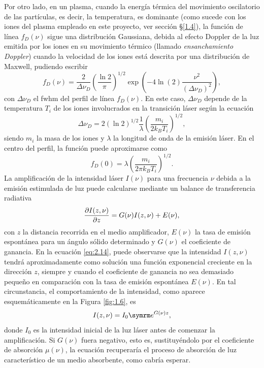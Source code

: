 Por otro lado, en un plasma, cuando la energía térmica del movimiento oscilatorio de las partículas, es decir, la temperatura, es dominante (como sucede con los iones del plasma empleado en este proyecto, ver sección \S\ref{1.4}), la función de línea $f_{D}(\nu)$ sigue una distribución Gaussiana, debida al efecto Doppler de la luz emitida por los iones en su movimiento térmico (llamado \emph{ensanchamiento Doppler})  cuando la velocidad de los iones está descrita por una distribución de Maxwell, pudiendo escribir \autocite{Tallents2003,Milonni1988,Oliva2010}
\begin{equation}\label{eq:1.13}
f_{D}(\nu) = \frac{2}{\Delta \nu_{D}} \left(\frac{\ln 2}{\pi}\right)^{1/2} \exp \left(-4 \ln(2) \frac{\nu^{2}}{(\Delta \nu_{D})^{2}}\right),
\end{equation}
con $\Delta \nu_{D}$ el \acrshort{fwhm} del perfil de línea $f_{D}(\nu)$. En este caso, $\Delta \nu_{D}$ depende de la temperatura $T_{i}$ de los iones involucrados en la transición láser según la ecuación
\begin{equation}\label{eq:1.14}
  \Delta \nu_{D} = 2(\ln 2)^{1/2} \frac{1}{\lambda}\left(\frac{m_{i}}{2k_{B}T_{i}}\right)^{1/2},
\end{equation}
siendo $m_{i}$ la masa de los iones y $\lambda$ la longitud de onda de la emisión láser. En el centro del perfil, la función puede aproximarse como
\begin{equation}\label{eq:1.15}
  f_{D}(0) = \lambda \left(\frac{m_{i}}{2 \pi k_{B}T_{i}}\right)^{1/2}.
\end{equation}
La amplificación de la intensidad láser $I(\nu)$ para una frecuencia $\nu$ debida a la emisión estimulada de luz puede calcularse mediante un balance de transferencia radiativa \autocite{Milonni1988}
\begin{equation}\label{eq:1.16}
  \frac{\partial I(z,\nu)}{\partial z} = G(\nu)I(z,\nu) + E(\nu),
\end{equation}
con $z$ la distancia recorrida en el medio amplificador, $E(\nu)$ la tasa de emisión espontánea para un ángulo sólido determinado y $G(\nu)$ el coeficiente de ganancia. En la ecuación \eqref{eq:2.14}, puede observarse que la intensidad $I(z,\nu)$ tendrá aproximadamente como solución una función exponencial creciente en la dirección $z$, siempre y cuando el coeficiente de ganancia no sea demasiado pequeño en comparación con la tasa de emisión espontánea $E(\nu)$. En tal circunstancia, el comportamiento de la intensidad, como aparece esquemáticamente en la Figura \ref{fig:1.6}, es
\begin{equation}\label{eq:1.17}
  I(z,\nu) = I_{0}\eu^{G(\nu)z},
\end{equation}
donde $I_{0}$ es la intensidad inicial de la luz láser antes de comenzar la amplificación. Si $G(\nu)$ fuera negativo, esto es, sustituyéndolo por el coeficiente de absorción $\mu(\nu)$, la ecuación recuperaría el proceso de absorción de luz característico de un medio absorbente, como cabría esperar. 

